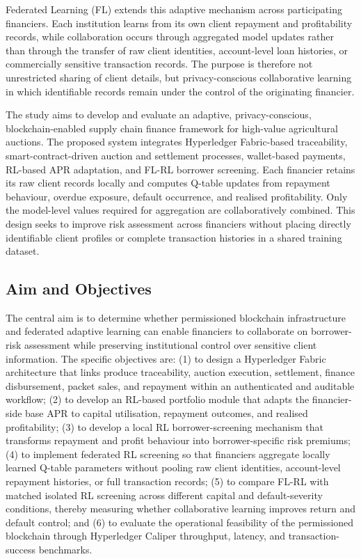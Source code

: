 \documentclass[12pt]{article}
\begin{document}
	Federated Learning (FL) extends this adaptive mechanism across participating financiers. Each institution learns from its own client repayment and profitability records, while collaboration occurs through aggregated model updates rather than through the transfer of raw client identities, account-level loan histories, or commercially sensitive transaction records. The purpose is therefore not unrestricted sharing of client details, but privacy-conscious collaborative learning in which identifiable records remain under the control of the originating financier.
	
The study aims to develop and evaluate an adaptive, privacy-conscious, blockchain-enabled supply chain finance framework for high-value agricultural auctions. The proposed system integrates Hyperledger Fabric-based traceability, smart-contract-driven auction and settlement processes, wallet-based payments, RL-based APR adaptation, and FL-RL borrower screening. Each financier retains its raw client records locally and computes Q-table updates from repayment behaviour, overdue exposure, default occurrence, and realised profitability. Only the model-level values required for aggregation are collaboratively combined. This design seeks to improve risk assessment across financiers without placing directly identifiable client profiles or complete transaction histories in a shared training dataset.

\subsection{Aim and Objectives}

The central aim is to determine whether permissioned blockchain infrastructure and federated adaptive learning can enable financiers to collaborate on borrower-risk assessment while preserving institutional control over sensitive client information. The specific objectives are: (1) to design a Hyperledger Fabric architecture that links produce traceability, auction execution, settlement, finance disbursement, packet sales, and repayment within an authenticated and auditable workflow; (2) to develop an RL-based portfolio module that adapts the financier-side base APR to capital utilisation, repayment outcomes, and realised profitability; (3) to develop a local RL borrower-screening mechanism that transforms repayment and profit behaviour into borrower-specific risk premiums; (4) to implement federated RL screening so that financiers aggregate locally learned Q-table parameters without pooling raw client identities, account-level repayment histories, or full transaction records; (5) to compare FL-RL with matched isolated RL screening across different capital and default-severity conditions, thereby measuring whether collaborative learning improves return and default control; and (6) to evaluate the operational feasibility of the permissioned blockchain through Hyperledger Caliper throughput, latency, and transaction-success benchmarks.
\end{document}

